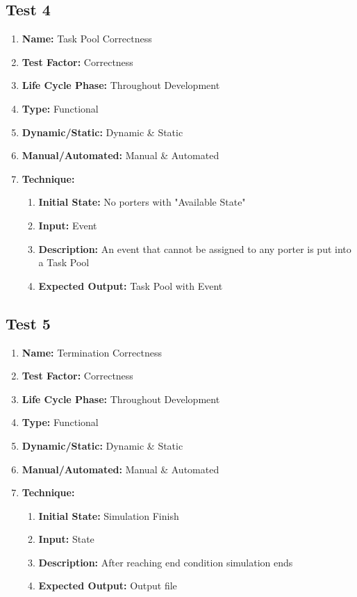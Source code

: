 \documentclass[paper=letter, fontsize=10pt]{scrartcl}
\numberwithin{equation}{section}		%
\numberwithin{figure}{section}			%
\numberwithin{table}{section}				%
\begin{document}
\subsection{Test 4}
\begin{enumerate}[a]
	\item \textbf{Name:} Task Pool Correctness
	\item \textbf{Test Factor:} Correctness
	\item \textbf{Life Cycle Phase:} Throughout Development
	\item \textbf{Type:} Functional
	\item \textbf{Dynamic/Static:} Dynamic \& Static
	\item \textbf{Manual/Automated:} Manual \& Automated
	\item \textbf{Technique:}
		\begin{enumerate}[i]
			\item \textbf{Initial State:} No porters with "Available State" 
			\item \textbf{Input:} Event
			\item \textbf{Description:} An event that cannot be assigned to any porter is put into a Task Pool
			\item \textbf{Expected Output:} Task Pool with Event
		\end{enumerate}
\end{enumerate}

\subsection{Test 5}
\begin{enumerate}[a]
	\item \textbf{Name:} Termination Correctness
	\item \textbf{Test Factor:} Correctness
	\item \textbf{Life Cycle Phase:} Throughout Development
	\item \textbf{Type:} Functional
	\item \textbf{Dynamic/Static:} Dynamic \& Static
	\item \textbf{Manual/Automated:} Manual \& Automated
	\item \textbf{Technique:}
		\begin{enumerate}[i]
			\item \textbf{Initial State:} Simulation Finish  
			\item \textbf{Input:} State
			\item \textbf{Description:} After reaching end condition simulation ends
			\item \textbf{Expected Output:} Output file
		\end{enumerate}
\end{enumerate}
\end{document}
